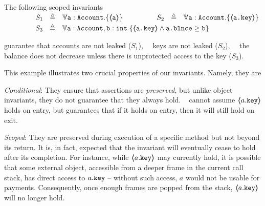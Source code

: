 \begin{example}
\label{s:bankSpecEx}
The following scoped invariants\\
$\strut \SPSP\ \ \   S_1\ \  \triangleq \ \ \TwoStatesN {\prg{a}:\prg{Account}}  {\inside{\prg{a}}} $ 
\hspace{1.1cm}
$\strut  \SPSP\ \ \   S_2\ \  \triangleq \ \ \TwoStatesN  {\prg{a}:\prg{Account}}  {\inside{\prg{a.key}}} $ 
\\
$\strut  \SPSP\ \ \   S_3\ \  \triangleq \ \ \TwoStatesN{ \prg{a}:\prg{Account},\prg{b}:\prg{int} } {\inside{\prg{a.key}} \wedge \prg{a.\balance} \geq \prg{b} } $ 

\noindent
 guarantee that   accounts are not leaked  ($S_1$), \ \ keys are not leaked  ($S_2$), \ \ the balance does not decrease unless there is unprotected access to the key  ($S_3$).
%
\end{example} 

 
\noindent
This example illustrates two crucial properties of our   invariants. Namely, they are

 \begin{customquote}
 \vspace{.05cm}
\noindent
\emph{Conditional}:   They ensure that assertions are \emph{preserved}, but unlike object invariants, they do not guarantee that they always hold.
\ \Eg   {} cannot assume $\langle\!\!\langle a.\mbox{\normalfont{\texttt{key}}} \rangle\!\!\rangle$ holds on entry, but   guarantees that if it holds on entry, then  it will still hold on exit.

\vspace{.05cm}
\noindent
\emph{Scoped}:  %
They are preserved during  execution of a specific method but not beyond its return. It is, in fact, expected that the invariant will eventually cease to hold after its completion. For instance, while $\langle\!\!\langle a.\mbox{\normalfont{\texttt{key}}} \rangle\!\!\rangle$ may currently hold, it is possible that some external object, accessible from a deeper frame in the current call stack, has direct access to $a.\mbox{\normalfont{\texttt{key}}}$ -- without such access, $a$ would not be usable for payments. Consequently, once enough frames are popped from the stack, $\langle\!\!\langle a.\mbox{\normalfont{\texttt{key}}} \rangle\!\!\rangle$  will no longer hold.

 \end{customquote}
 
